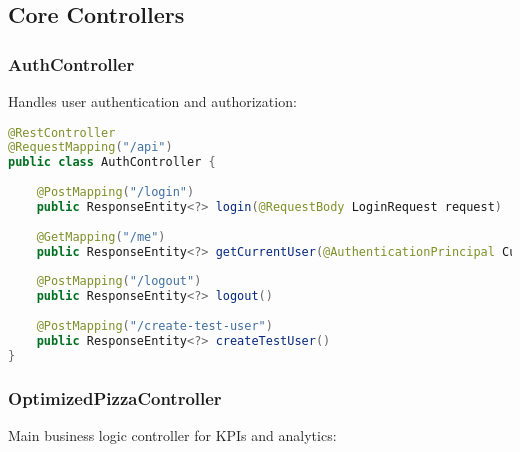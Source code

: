 \documentclass[11pt,a4paper]{article}
\begin{document}
\subsection{Core Controllers}

\subsubsection{AuthController}
Handles user authentication and authorization:

\begin{lstlisting}[language=java, caption=Authentication Endpoints]
@RestController
@RequestMapping("/api")
public class AuthController {
    
    @PostMapping("/login")
    public ResponseEntity<?> login(@RequestBody LoginRequest request)
    
    @GetMapping("/me") 
    public ResponseEntity<?> getCurrentUser(@AuthenticationPrincipal CustomUserDetails user)
    
    @PostMapping("/logout")
    public ResponseEntity<?> logout()
    
    @PostMapping("/create-test-user")
    public ResponseEntity<?> createTestUser()
}
\end{lstlisting}

\subsubsection{OptimizedPizzaController}
Main business logic controller for KPIs and analytics:
\end{document}
